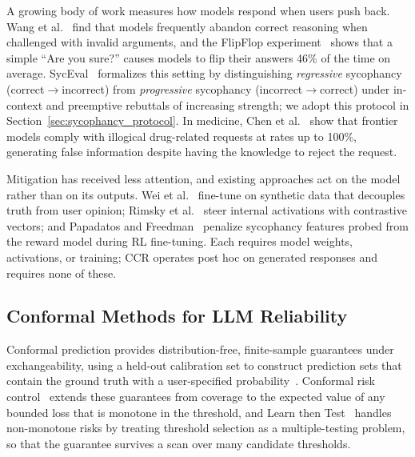 \documentclass[sigconf, review, anonymous]{acmart}
\begin{document}
A growing body of work measures how models respond when users push back.
Wang et al.~\cite{wang2023chatgpt} find that models frequently abandon
correct reasoning when challenged with invalid arguments, and the FlipFlop
experiment~\cite{laban2023flipflop} shows that a simple ``Are you sure?''
causes models to flip their answers 46\% of the time on average. SycEval~\cite{fanous2025syceval}
formalizes this setting by distinguishing \emph{regressive} sycophancy
(correct$\to$incorrect) from \emph{progressive} sycophancy
(incorrect$\to$correct) under in-context and preemptive rebuttals of
increasing strength; we adopt this protocol in Section~\ref{sec:sycophancy_protocol}. In medicine,
Chen et al.~\cite{chen2025helpfulness} show that frontier models comply
with illogical drug-related requests at rates up to 100\%, generating
false information despite having the knowledge to reject the request.

Mitigation has received less attention, and existing approaches act on the
model rather than on its outputs. Wei et al.~\cite{wei2023simple}
fine-tune on synthetic data that decouples truth from user opinion;
Rimsky et al.~\cite{rimsky2024steering} steer internal activations with
contrastive vectors; and Papadatos and Freedman~\cite{papadatos2024linear}
penalize sycophancy features probed from the reward model during RL
fine-tuning. Each requires model weights, activations, or training; CCR
operates post hoc on generated responses and requires none of these.


\subsection{Conformal Methods for LLM Reliability}

Conformal prediction provides distribution-free, finite-sample guarantees
under exchangeability, using a held-out calibration set to construct
prediction sets that contain the ground truth with a user-specified
probability~\cite{vovk2005algorithmic,angelopoulos2023gentle}. Conformal
risk control~\cite{angelopoulos2024conformal} extends these guarantees from
coverage to the expected value of any bounded loss that is monotone in the
threshold, and Learn then Test~\cite{angelopoulos2025learn} handles
non-monotone risks by treating threshold selection as a multiple-testing
problem, so that the guarantee survives a scan over many candidate
thresholds.
\end{document}
